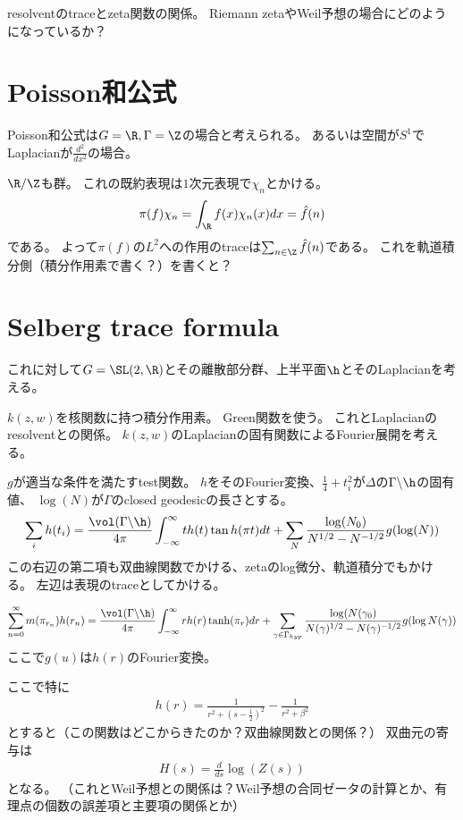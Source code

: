 \documentclass{jsarticle}
\begin{document}
resolventのtraceとzeta関数の関係。
Riemann zetaやWeil予想の場合にどのようになっているか？

\section{Poisson和公式}
Poisson和公式は$G=\R, \Gamma=\Z$の場合と考えられる。
あるいは空間が$S^1$でLaplacianが$\frac{d^2}{dx^2}$の場合。

$\R/\Z$も群。
これの既約表現は$1$次元表現で$\chi_n$とかける。
\begin{align*}
\pi(f)\chi_n=\int_{\R}f(x)\chi_n(x)dx=\hat{f}(n)
\end{align*}
である。
よって$\pi(f)$の$L^2$への作用のtraceは$\sum_{n\in\Z}\hat{f}(n)$である。
これを軌道積分側（積分作用素で書く？）を書くと？

\section{Selberg trace formula}
これに対して$G=\SL(2,\R)$とその離散部分群、上半平面$\h$とそのLaplacianを考える。

$k(z,w)$を核関数に持つ積分作用素。
Green関数を使う。
これとLaplacianのresolventとの関係。
$k(z,w)$のLaplacianの固有関数によるFourier展開を考える。

\begin{thm}
$g$が適当な条件を満たすtest関数。
$h$をそのFourier変換、$\frac{1}{4}+t_i^2$が$\Delta$の$\Gamma\backslash\h$の固有値、
$\log(N)$が$\Gamma$のclosed geodesicの長さとする。
\begin{align*}
\sum_ih(t_i)=\frac{\vol(\Gamma\backslash\h)}{4\pi}\int^\infty_{-\infty}th(t)\tan h(\pi t)dt+\sum_N\frac{\log(N_0)}{N^{1/2}-N^{-1/2}}g(\log(N))
\end{align*}
この右辺の第二項も双曲線関数でかける、zetaのlog微分、軌道積分でもかける。
左辺は表現のtraceとしてかける。
\end{thm}


\begin{align*}
\sum^\infty_{n=0}m(\pi_{r_n})h(r_n)=\frac{\vol(\Gamma\backslash\h)}{4\pi}\int^\infty_{-\infty}rh(r)\tanh(\pi_r)dr+\sum_{\gamma\in\Gamma_{hyp}}\frac{\log(N(\gamma_0)}{N(\gamma)^{1/2}-N(\gamma)^{-1/2}}g(\log N(\gamma))
\end{align*}
ここで$g(u)$は$h(r)$のFourier変換。

ここで特に
\begin{align*}
h(r)=\frac{1}{r^2+(s-\frac{1}{2})^2}-\frac{1}{r^2+\beta^2}
\end{align*}
とすると（この関数はどこからきたのか？双曲線関数との関係？）
双曲元の寄与は
\begin{align*}
H(s)=\frac{d}{ds}\log(Z(s))
\end{align*}
となる。
（これとWeil予想との関係は？Weil予想の合同ゼータの計算とか、有理点の個数の誤差項と主要項の関係とか）
\end{document}
